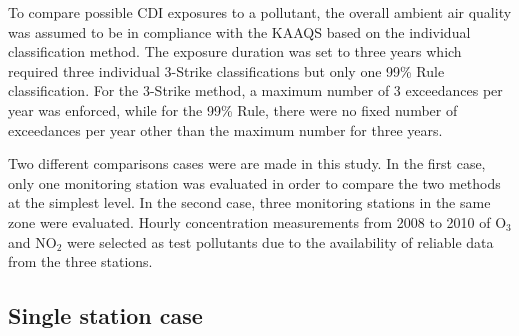 To compare possible CDI exposures to a pollutant, the overall ambient air quality was assumed to be in compliance with the KAAQS based on the individual classification method. The exposure duration was set to three years which required three individual 3-Strike classifications but only one 99\% Rule classification. For the 3-Strike method, a maximum number of 3 exceedances per year was enforced, while for the 99\% Rule, there were no fixed number of exceedances per year other than the maximum number for three years.

Two different comparisons cases were are made in this study. In the first case, only one monitoring station was evaluated in order to compare the two methods at the simplest level. In the second case, three monitoring stations in the same zone were evaluated.  Hourly concentration measurements from 2008 to 2010 of O$_{3}$ and NO$_{2}$ were selected as test pollutants due to the availability of reliable data from the three stations. 

\subsection{Single station case}

